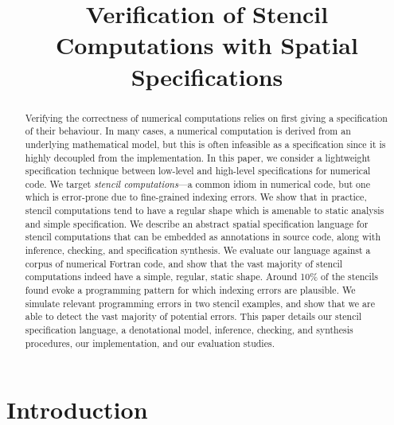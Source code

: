 \documentclass[9pt,preprint]{sigplanconf}
\title{Verification of Stencil Computations with Spatial
  Specifications}
\theoremstyle{definition}
\begin{document}
\maketitle

\begin{abstract}
  Verifying the correctness of numerical computations relies on first
  giving a specification of their behaviour. In many cases, a
  numerical computation is derived from an underlying mathematical
  model, but this is often infeasible as a specification since it
  is highly decoupled from the implementation. In this paper, we consider a 
  lightweight specification technique between low-level and
  high-level specifications for numerical code. We
  target \emph{stencil computations}---a common idiom in numerical
  code, but one which is error-prone due to fine-grained indexing
  errors. We show that in practice, stencil computations tend
  to have a regular shape which is amenable to static analysis and
  simple specification. We describe an abstract spatial specification
  language for stencil computations that can be embedded as
  annotations in source code, along with inference, checking, and
  specification synthesis. We evaluate our
  language against a corpus of numerical Fortran code, and show that
  the vast majority of stencil computations indeed have a simple,
  regular, static shape. Around 10\% of the stencils found evoke a
  programming pattern for which indexing errors are plausible. 
  We simulate relevant programming errors in two stencil examples, 
  and show that we are able to detect the vast majority of potential
  errors. This paper details our stencil specification language, a
  denotational model, inference,
  checking, and synthesis procedures, our implementation, and
  our evaluation studies.
\end{abstract}





\section{Introduction}
\end{document}
